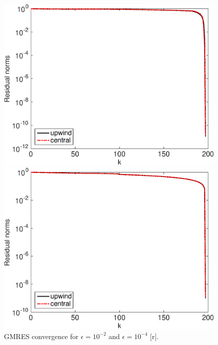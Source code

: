 \begin{figure}[h!]
\begin{minipage}[t]{0.48\linewidth}
\includegraphics[width=0.98\linewidth]{figures/gmres_eps_1e-02_N_198}
\end{minipage}
%
\begin{minipage}[t]{0.48\linewidth}
\includegraphics[width=0.98\linewidth]{figures/gmres_eps_1e-04_N_198}
\end{minipage}
\caption{GMRES convergence for $\epsilon=10^{-2}$ and $\epsilon=10^{-4}$ [r].}
\label{fig:back:GMRES.N198.eps4}
\end{figure}
